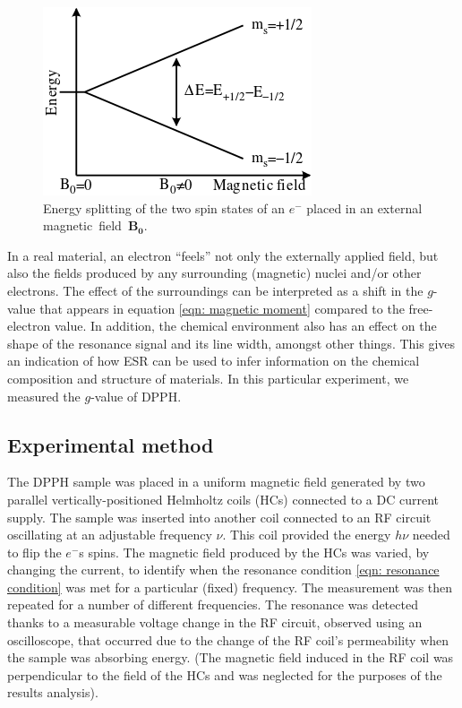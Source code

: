 \documentclass[a4paper]{jpconf}
\numberwithin{equation}{section}
\begin{document}
\begin{figure}[htbp]
	\includegraphics[scale=0.75]{EPR_splitting.png}
	\hspace{2pc}
	\begin{minipage}[b]{3in}
		\caption{Energy splitting of the two spin states of an $e^-$ placed in an external magnetic~field~$\mathbf{B_0}$.}
	\end{minipage}
	\label{fig: energy splitting}
\end{figure}

In a real material, an electron ``feels'' not only the externally applied field, but also the fields produced by any surrounding (magnetic) nuclei and/or other electrons. The effect of the surroundings can be interpreted as a shift in the $g$-value that appears in equation \eqref{eqn: magnetic moment} compared to the free-electron value. In addition, the chemical environment also has an effect on the shape of the resonance signal and its line width, amongst other things. This gives an indication of how ESR can be used to infer information on the chemical composition and structure of materials. In this particular experiment, we measured the $g$-value of DPPH.

\subsection{Experimental method}\label{section: method}
The DPPH sample was placed in a uniform magnetic field generated by two parallel vertically-positioned Helmholtz coils (HCs) connected to a DC current supply. The sample was inserted into another coil connected to an RF circuit oscillating at an adjustable frequency $\nu$. This coil provided the energy $h\nu$ needed to flip the $e^-$s spins. The magnetic field produced by the HCs was varied, by changing the current, to identify when the resonance condition \eqref{eqn: resonance condition} was met for a particular (fixed) frequency. The measurement was then repeated for a number of different frequencies. The resonance was detected thanks to a measurable voltage change in the RF circuit, observed using an oscilloscope, that occurred due to the change of the RF coil's permeability when the sample was absorbing energy. (The magnetic field induced in the RF coil was perpendicular to the field of the HCs and was neglected for the purposes of the results analysis).
\end{document}
